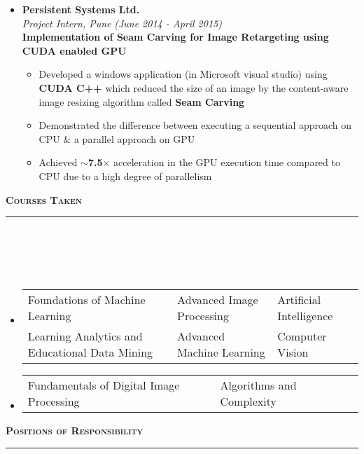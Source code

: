 \documentclass[a4paper,10pt]{article}
\newcommand{\isep}{-2 pt}
\newcommand{\lsep}{-0.5cm}
\newcommand{\resheading}[1]{{\small
        {
            \begin{minipage}
                {0.992\textwidth}\textbf{{\textsc{#1 \vphantom{p\^{E}} }}}
                \\[-0.3cm]
                \hrule
            \end{minipage}
            \\[-0.5cm]
        }
 }}
\begin{document}
\begin{itemize}
    \item \textbf{Persistent Systems Ltd.} \\
    \emph{Project Intern, Pune} \hfill {\emph{(June 2014 - April 2015)}}\\
    \textbf{Implementation of Seam Carving for Image Retargeting using CUDA enabled GPU}\\ [-0.6cm]
    \begin{itemize}\itemsep \isep
    \item Developed a windows application (in Microsoft visual studio) using \textbf{CUDA C++} which reduced the size of an image by the content-aware image resizing algorithm called \textbf{Seam Carving}\\[-0.32cm]
    \item Demonstrated the difference between executing a sequential approach on CPU \& a parallel approach on GPU\\[-0.32cm]
    \item Achieved \textbf{$\sim$7.5$\times$} acceleration in the GPU execution time compared to CPU due to a high degree of parallelism
    \end{itemize}
\end{itemize}
\vspace{-0.1cm}
\resheading{\textbf{\large Courses Taken }}\\[\lsep]
\\[-0.3cm]
\begin{itemize}
    \item[] \begin{tabular}{p{8cm}p{5cm}l }
    Foundations of Machine Learning & Advanced Image Processing  & Artificial Intelligence\\ 
    Learning Analytics and Educational Data Mining & Advanced Machine Learning   &  Computer Vision
    \end{tabular}
    \vspace{-0.25cm}
    \item[] \begin{tabular}{p{8cm}p{5cm}l }
    Fundamentals of Digital Image Processing & Algorithms and Complexity
    \end{tabular}
\end{itemize}
\resheading{\textbf{\large Positions of Responsibility}}\\[\lsep] 
\end{document}
